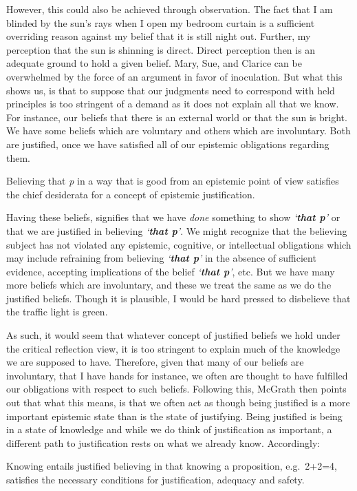 \documentclass[
  letterpaper,
  DIV=11,
  numbers=noendperiod]{scrartcl}
\theoremstyle{remark}
\begin{document}
However, this could also be achieved through observation. The fact that
I am blinded by the sun's rays when I open my bedroom curtain is a
sufficient overriding reason against my belief that it is still night
out. Further, my perception that the sun is shinning is direct. Direct
perception then is an adequate ground to hold a given belief. Mary, Sue,
and Clarice can be overwhelmed by the force of an argument in favor of
inoculation. But what this shows us, is that to suppose that our
judgments need to correspond with held principles is too stringent of a
demand as it does not explain all that we know. For instance, our
beliefs that there is an external world or that the sun is bright. We
have some beliefs which are voluntary and others which are involuntary.
Both are justified, once we have satisfied all of our epistemic
obligations regarding them.

Believing that \emph{p} in a way that is good from an epistemic point of
view satisfies the chief desiderata for a concept of epistemic
justification.

Having these beliefs, signifies that we have \emph{done} something to
show \emph{`\textbf{that p}'} or that we are justified in believing
\emph{`\textbf{that p}'}. We might recognize that the believing subject
has not violated any epistemic, cognitive, or intellectual obligations
which may include refraining from believing \emph{`\textbf{that p}'} in
the absence of sufficient evidence, accepting implications of the belief
\emph{`\textbf{that p}'}, etc. But we have many more beliefs which are
involuntary, and these we treat the same as we do the justified beliefs.
Though it is plausible, I would be hard pressed to disbelieve that the
traffic light is green.

As such, it would seem that whatever concept of justified beliefs we
hold under the critical reflection view, it is too stringent to explain
much of the knowledge we are supposed to have. Therefore, given that
many of our beliefs are involuntary, that I have hands for instance, we
often are thought to have fulfilled our obligations with respect to such
beliefs. Following this, McGrath then points out that what this means,
is that we often act as though being justified is a more important
epistemic state than is the state of justifying. Being justified is
being in a state of knowledge and while we do think of justification as
important, a different path to justification rests on what we already
know. Accordingly:

Knowing entails justified believing in that knowing a proposition,
e.g.~2+2=4, satisfies the necessary conditions for justification,
adequacy and safety.
\end{document}
